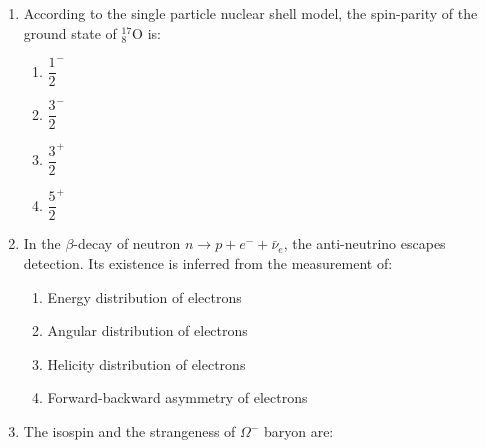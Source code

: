 \documentclass[journal,12pt,onecolumn]{IEEEtran}
\begin{document}
\begin{enumerate}
The charge density on the sphere at $\theta = 30^\circ$ is:

\hfill{}

\begin{multicols}{4}
\begin{enumerate}
    \item $\dfrac{3\sqrt{3} \ \epsilon_{0} E_{0}}{2}$
    \item $\dfrac{3 \ \epsilon_{0} E_{0}}{2}$
    \item $\dfrac{\sqrt{3} \ \epsilon_{0} E_{0}}{2}$
    \item $\dfrac{\epsilon_{0} E_{0}}{2}$
\end{enumerate}
\end{multicols}

\item According to the single particle nuclear shell model, the spin-parity of the ground state of ${}^{17}_{8}\mathrm{O}$ is:

\hfill{}

\begin{multicols}{4}
\begin{enumerate}
    \item $\dfrac{1}{2}^-$
    \item $\dfrac{3}{2}^-$
    \item $\dfrac{3}{2}^+$
    \item $\dfrac{5}{2}^+$
\end{enumerate}
\end{multicols}

\item In the $\beta$-decay of neutron $n \rightarrow p + e^- + \bar{\nu}_e$, the anti-neutrino escapes detection. Its existence is inferred from the measurement of:

\hfill{}

\begin{multicols}{2}
\begin{enumerate}
    \item Energy distribution of electrons
    \item Angular distribution of electrons
    \item Helicity distribution of electrons
    \item Forward-backward asymmetry of electrons
\end{enumerate}
\end{multicols}

\item The isospin and the strangeness of $\Omega^-$ baryon are:


\end{enumerate}
\end{document}
